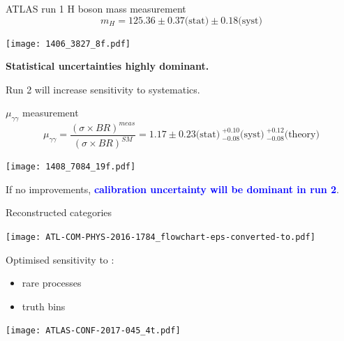 \begin{frame}{ATLAS run 1 H boson mass measurement}
\centering
$$m_H = 125.36 \pm 0.37 \text{(stat)} \pm 0.18 \text{(syst)}$$
\begin{minipage}{0.49\linewidth}
  \texttt{[image: 1406\_3827\_8f.pdf]}
\end{minipage}
\hfill
\begin{minipage}{0.49\linewidth}
\end{minipage}
    {\bf Statistical uncertainties highly dominant.}\\
    \begin{center}   Run 2 will increase sensitivity to systematics.\end{center}
\end{frame}

\begin{frame}{$\mu_{\gamma\gamma}$ measurement}
$$\mu_{\gamma\gamma}=\frac{(\sigma\times BR)^{meas}}{(\sigma\times BR)^{SM}}=1.17 \pm 0.23 \text{(stat)}\ ^{+0.10}_{-0.08}\text{(syst)}\ ^{+0.12}_{-0.08} \text{(theory)}$$
  \begin{minipage}{0.49\linewidth}
    \texttt{[image: 1408\_7084\_19f.pdf]}
  \end{minipage}
  \hfill
  \begin{minipage}{0.49\linewidth}
  \end{minipage}
If no improvements, \textcolor{blue}{\bf calibration uncertainty will be dominant in run 2}.
\end{frame}
\begin{frame}{Reconstructed categories}
  \begin{minipage}{0.49\linewidth}
      \texttt{[image: ATL-COM-PHYS-2016-1784\_flowchart-eps-converted-to.pdf]}
  \end{minipage}
  \hfill
  \begin{minipage}{0.49\linewidth}
    Optimised sensitivity to :
    \begin{itemize}
    \item rare processes
    \item truth bins
    \end{itemize}
    \texttt{[image: ATLAS-CONF-2017-045\_4t.pdf]}
  \end{minipage}
\end{frame}

